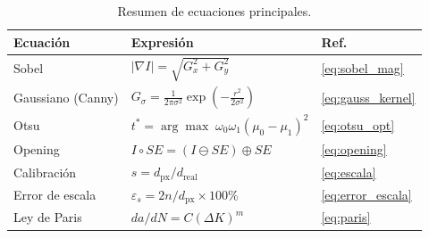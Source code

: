 \documentclass[12pt,a4paper]{article}
\begin{document}
\begin{table}[H]
	\centering
	\caption{Resumen de ecuaciones principales.}
	\small
	\begin{tabularx}{\textwidth}{l X l}
		\toprule
		\textbf{Ecuación} & \textbf{Expresión}
		                  & \textbf{Ref.}                                                    \\
		\midrule
		Sobel             & $|\nabla I| = \sqrt{G_x^2 + G_y^2}$
		                  & \eqref{eq:sobel_mag}                                             \\
		Gaussiano (Canny) & $G_\sigma = \frac{1}{2\pi\sigma^2}\exp(-\tfrac{r^2}{2\sigma^2})$
		                  & \eqref{eq:gauss_kernel}                                          \\
		Otsu              & $t^* = \arg\max\;\omega_0\omega_1(\mu_0-\mu_1)^2$
		                  & \eqref{eq:otsu_opt}                                              \\
		Opening           & $I \circ SE = (I\ominus SE)\oplus SE$
		                  & \eqref{eq:opening}                                               \\
		Calibración       & $s = d_\mathrm{px}/d_\mathrm{real}$
		                  & \eqref{eq:escala}                                                \\
		Error de escala   & $\varepsilon_s = 2n/d_\mathrm{px}\times100\%$
		                  & \eqref{eq:error_escala}                                          \\
		Ley de Paris      & $da/dN = C(\Delta K)^m$
		                  & \eqref{eq:paris}                                                 \\
		\bottomrule
	\end{tabularx}
\end{table}
\end{document}
